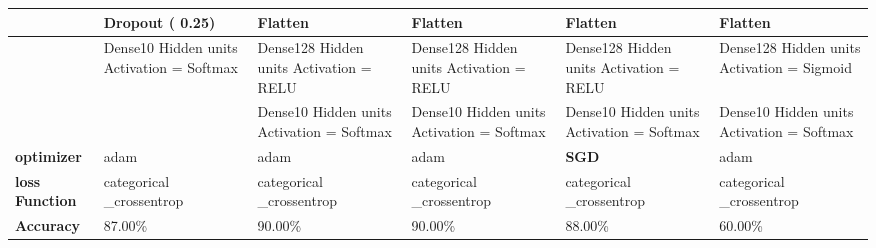 \documentclass{article}
\begin{document}
\begin{adjustbox}{angle=90}
\begin{tabular}{|p{2cm}|p{3cm}|p{3cm}|p{3cm}|p{3cm}|p{3cm}|}
                        & Dropout ( 0.25)                                                     & Flatten                                       & Flatten                                                    & Flatten                                                    & Flatten                                                       \\ \hline
                        & Dense10 Hidden units Activation = Softmax                           & Dense128 Hidden units Activation = RELU       & Dense128 Hidden units Activation = RELU                    & Dense128 Hidden units Activation = RELU                    & Dense128 Hidden units Activation = Sigmoid                    \\ \hline
                        &                                                                     & Dense10 Hidden units Activation = Softmax     & Dense10 Hidden units Activation = Softmax                  & Dense10 Hidden units Activation = Softmax                  & Dense10 Hidden units Activation = Softmax                     \\ \hline
\textbf{optimizer}      & adam                                                                & adam                                          & adam                                                       & \textbf{SGD}                                               & adam                                                          \\ \hline
\textbf{loss Function}  & categorical \_crossentrop                                            & categorical \_crossentrop                      & categorical \_crossentrop                                   & categorical \_crossentrop                                   & categorical \_crossentrop                                      \\ \hline
\textbf{Accuracy}       & 87.00\%                                                             & 90.00\%                                       & 90.00\%                                                    & 88.00\%                                                    & 60.00\%                                                       \\ \hline
\end{tabular}
\end{adjustbox}
\end{document}
